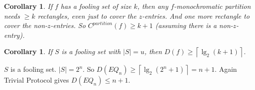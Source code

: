 \documentclass[twoside]{article}
\newtheorem{corollary}[theorem]{Corollary}
\newcommand{\abs}[1]{\left | #1 \right |}
\newcommand{\ceil}[1]{\left \lceil #1 \right \rceil }
\begin{document}
\begin{corollary}
    If $f$ has a fooling set of size $k$, then any $f$-monochromatic partition needs $\geq k$ rectangles, even just to cover the $z$-entries. And one more rectangle to cover the non-$z$-entries. So $C^{partition}(f) \geq k + 1$ (assuming there is a non-$z$-entry).
\end{corollary}

\begin{corollary}
    If $S$ is a fooling set with $\abs{S} = u$, then $D(f) \geq \ceil{\lg_2(k + 1)}$.
\end{corollary}

$S$ is a fooling set. $\abs{S} = 2^n$. So $D(EQ_n) \geq \ceil{\lg_2(2^n + 1)} = n + 1$. Again Trivial Protocol gives $D(EQ_n) \leq n + 1$.
\end{document}
